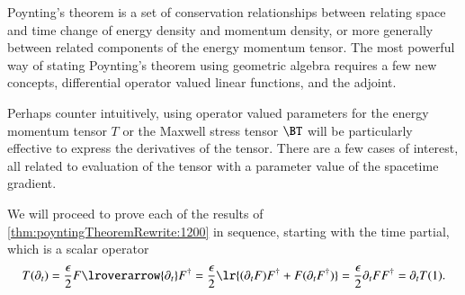 %
%
Poynting's theorem is a set of conservation relationships between relating space and time change of energy density and momentum density, or more generally between related components of the energy momentum tensor.
The most powerful way of stating Poynting's theorem using geometric algebra requires a few new concepts, differential operator valued linear functions, and the adjoint.


Perhaps counter intuitively, using operator valued parameters for the energy momentum tensor \( T \) or the Maxwell stress tensor \( \BT \) will be particularly effective to express the derivatives of the tensor.  There are a few cases of interest, all related to evaluation of the tensor with a parameter value of the spacetime gradient.

We will proceed to prove each of the results of
\cref{thm:poyntingTheoremRewrite:1200} in sequence, starting with the time partial, which is a scalar operator
\begin{dmath}\label{eqn:poyntingTheoremRewrite:1220}
T(\partial_t)
=
\frac{\epsilon}{2}
 F \lroverarrow{\partial_t} F^\dagger
=
\frac{\epsilon}{2}
\lr{
 (\partial_t F) F^\dagger
+
 F (\partial_t F^\dagger)
}
=
\frac{\epsilon}{2}
\partial_t
 F F^\dagger
=
\partial_t T(1).
\end{dmath}

